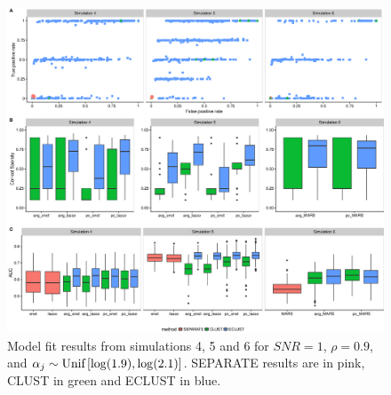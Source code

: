 \begin{appendices}
\begin{figure}[H]
	\centering
	\includegraphics[scale=0.40, keepaspectratio]{./figs/guillimin/results/figures/sim4-5-6-combined/modelfit_sim456.eps}
	\caption{Model fit results from simulations 4, 5 and 6 for $SNR=1$, $\rho = 0.9$, and \mbox{$\alpha_{j} \sim \textrm{{Unif}}\left[\log(1.9), \log(2.1)\right]$}. SEPARATE results are in pink, CLUST in green and ECLUST in blue.}
	\label{fig:sim-modelfit456}
\end{figure}


\end{appendices}
